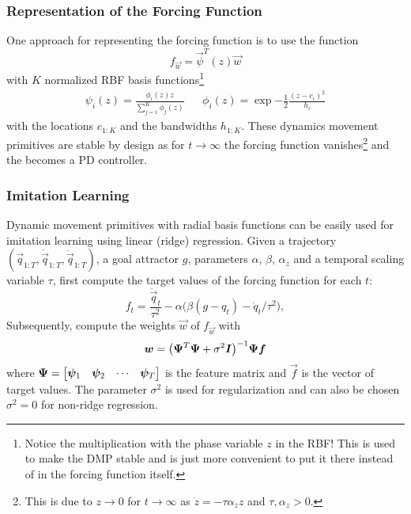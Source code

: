 			\subsubsection{Representation of the Forcing Function}
				One approach for representing the forcing function is to use the function
				\begin{equation*}
					f_{\vec{w}} = \vec{\psi}^T(z) \vec{w}
				\end{equation*}
				with \(K\) normalized RBF basis functions\footnote{Notice the multiplication with the phase variable \(z\) in the RBF! This is used to make the DMP stable and is just more convenient to put it there instead of in the forcing function itself.}
				\begin{align}
					\psi_i(z) = \frac{\phi_i(z) z}{\sum_{j = 1}^{K} \phi_j(z)}
					&&
					\phi_i(z) = \exp{ -\frac{1}{2} \frac{(z - c_i)^2}{h_i} }  \label{eq:normRbf}
				\end{align}
				with the locations \(c_{1:K}\) and the bandwidths \(h_{1:K}\). These dynamics movement primitives are stable by design as for \( t \to \infty \) the forcing function vanishes\footnote{This is due to \( z \to 0 \) for \( t \to \infty \) as \( \dot{z} = -\tau \alpha_z z \) and \( \tau, \alpha_z > 0 \).} and the  becomes a PD controller.

			\subsubsection{Imitation Learning}
				Dynamic movement primitives with radial basis functions can be easily used for imitation learning using linear (ridge) regression. Given a trajectory \( (\vec{q}_{1:T}, \dot{\vec{q}}_{1:T}, \ddot{\vec{q}}_{1:T}) \), a goal attractor \(g\), parameters \(\alpha\), \(\beta\), \(\alpha_z\) and a temporal scaling variable \(\tau\), first compute the target values of the forcing function for each \(t\):
				\begin{equation*}
					f_t = \frac{\ddot{\vec{q}}_t}{\tau^2} - \alpha \big( \beta (g - q_t) - \dot{q}_t / \tau^2 \big),
				\end{equation*}
				Subsequently, compute the weights \(\vec{w}\) of \( f_{\vec{w}} \) with
				\begin{equation*}
					\bm{w} = \big( \bm{\Psi}^T \bm{\Psi} + \sigma^2 \bm{I} \big)^{-1} \bm{\Psi} \bm{f}
				\end{equation*}
				where \( \bm{\Psi} = \begin{bmatrix} \bm{\psi}_1 & \bm{\psi}_2 & \cdots & \bm{\psi}_T \end{bmatrix} \) is the feature matrix and \(\vec{f}\) is the vector of target values. The parameter \(\sigma^2\) is used for regularization and can also be chosen \( \sigma^2 = 0 \) for non-ridge regression.

